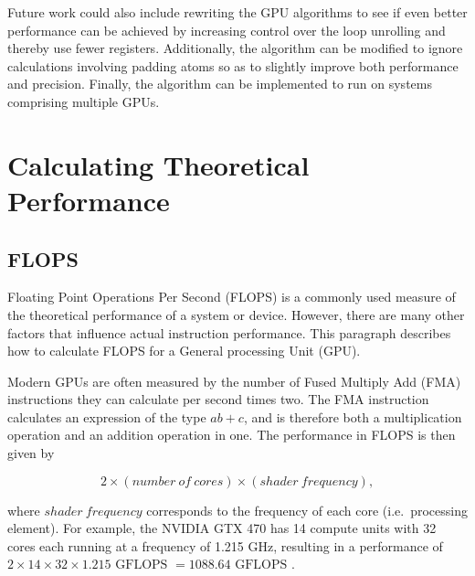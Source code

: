 \documentclass[11pt,twoside]{report}
\begin{document}
\indent Future work could also include rewriting the GPU algorithms to see if even better performance can be achieved by increasing control over the loop unrolling and thereby use fewer registers. Additionally, the algorithm can be modified to ignore calculations involving padding atoms so as to slightly improve both performance and precision. Finally, the algorithm can be implemented to run on systems comprising multiple GPUs.


\addtolength{\textwidth}{-5cm} %
\addtolength{\hoffset}{1.5cm}
\addtolength{\textheight}{-4cm}
\addtolength{\voffset}{2cm}


\newpage
\appendix 
\chapter{Calculating Theoretical Performance}
\section{FLOPS}
\label{app:FLOPS}
Floating Point Operations Per Second (FLOPS) is a commonly used measure of the theoretical performance of a system or device. However, there are many other factors that influence actual instruction performance. This paragraph describes how to calculate FLOPS for a General processing Unit (GPU).


\indent  Modern GPUs are often measured by the number of Fused Multiply Add (FMA)  instructions they can calculate per second times two. The FMA instruction calculates an expression of the type $ab +c$, and is therefore both a multiplication operation and an addition operation in one. The performance in FLOPS is then given by 

\begin{equation}
	2\times(number~of~cores)\times(shader~frequency) ,
\end{equation}

\noindent where  $shader~frequency$ corresponds to the frequency of each core (i.e.\ processing element). For example, the NVIDIA GTX 470 has 14 compute units with 32 cores each running at a frequency of 1.215 GHz, resulting in a performance of $2\times14\times32\times1.215 \mbox{ GFLOPS }= 1088.64 \mbox{ GFLOPS }$.
\end{document}

